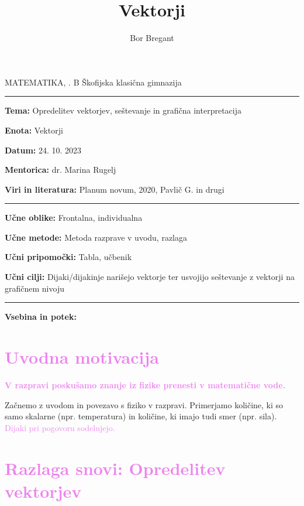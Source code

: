 \documentclass{article}
\title{Vektorji}
\author{Bor Bregant}
\date{\vspace{-5ex}}
\begin{document}
\thispagestyle{empty}	%

\noindent MATEMATIKA, . B \hfill Škofijska klasična gimnazija
\hrule
\vspace{1ex}
\noindent \textbf{Tema:} Opredelitev vektorjev, seštevanje in grafična interpretacija
\vspace{1ex}

\noindent \textbf{Enota:} Vektorji
\vspace{1ex}

\noindent \textbf{Datum:} 24. 10. 2023
\vspace{1ex}

\noindent \textbf{Mentorica:} dr. Marina Rugelj
\vspace{1ex}

\noindent \textbf{Viri in literatura:} Planum novum, 2020, Pavlič G. in drugi
\vspace{1ex}
\hrule
\vspace{2ex}
\noindent \textbf{Učne oblike:} Frontalna, individualna
\vspace{1ex}

\noindent \textbf{Učne metode:} Metoda razprave v uvodu, razlaga
\vspace{1ex}

\noindent \textbf{Učni pripomočki:} Tabla, učbenik
\vspace{1ex}

\noindent \textbf{Učni cilji:} Dijaki/dijakinje narišejo vektorje ter usvojijo seštevanje z vektorji na grafičnem nivoju
\vspace{4ex}
\hrule
\vspace{5ex}
\noindent \textbf{Vsebina in potek:} 

\vspace{5ex}

\section*{\textcolor{violet}{Uvodna motivacija}}

\textbf{\textcolor{violet}{V razpravi poskušamo znanje iz fizike prenesti v matematične vode.}}

Začnemo z uvodom in povezavo s fiziko v razpravi. Primerjamo količine, ki so samo skalarne (npr. temperatura) in količine, ki imajo tudi smer (npr. sila). \textcolor{violet}{Dijaki pri pogovoru sodelujejo.}


\section*{\textcolor{violet}{Razlaga snovi: Opredelitev vektorjev}}
\end{document}
